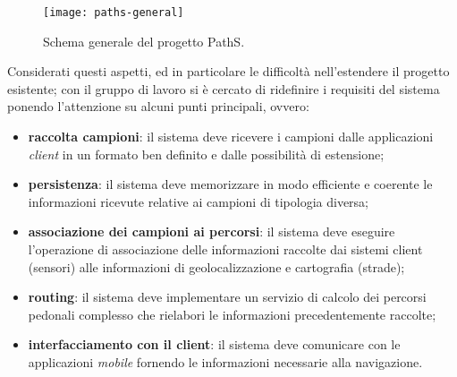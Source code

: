 \begin{figure}[ht]
  \centering
  \texttt{[image: paths-general]}
  \caption{\footnotesize{Schema generale del progetto PathS.}}
  \label{fig:paths-general}
\end{figure}

Considerati questi aspetti, ed in particolare le difficoltà nell'estendere il progetto esistente;  con il gruppo di lavoro si è cercato di ridefinire i requisiti del sistema ponendo l'attenzione su alcuni punti principali, ovvero:
\begin{itemize}
\item \textbf{raccolta campioni}: il sistema deve ricevere i campioni dalle applicazioni \emph{client} in un formato ben definito e dalle possibilità di estensione;
\item \textbf{persistenza}: il sistema deve memorizzare in modo efficiente e coerente le informazioni ricevute relative ai campioni di tipologia diversa;
\item \textbf{associazione dei campioni ai percorsi}: il sistema deve eseguire l'operazione di associazione delle informazioni raccolte dai sistemi client (sensori) alle informazioni di geolocalizzazione e cartografia (strade);
\item \textbf{routing}: il sistema deve implementare un servizio di calcolo dei percorsi pedonali complesso che rielabori le informazioni precedentemente raccolte;
\item \textbf{interfacciamento con il client}: il sistema deve comunicare con le applicazioni \emph{mobile} fornendo le informazioni necessarie alla navigazione.
\end{itemize}

